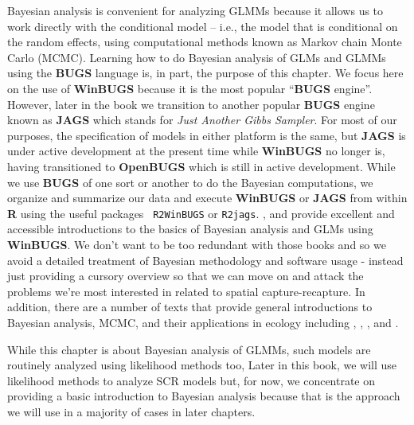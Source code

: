 Bayesian analysis is convenient for analyzing GLMMs because it allows
us to work directly with the conditional model -- i.e., the model that
is conditional on the random effects, using computational methods
known as Markov chain Monte Carlo (MCMC). Learning how to do Bayesian
analysis of GLMs and GLMMs using the {\bf BUGS} language is, in part, the purpose
of this chapter. We focus here on the use of {\bf WinBUGS} because it
is the most popular ``{\bf BUGS} engine''. However, later in the book
we transition to another popular {\bf BUGS} engine known as {\bf
  JAGS} \citep{plummer:2009} which stands for {\it Just Another Gibbs
  Sampler}. For most of our purposes, the specification of models in
either platform is the same, but {\bf JAGS} is under active
development at the present time while {\bf WinBUGS} no longer is,
having transitioned to 
{\bf OpenBUGS} \citep{lunn_etal:2009} which is still in active
development.  
 While we use {\bf BUGS} of one sort or another to do the Bayesian
computations, we organize and summarize our data and execute {\bf
  WinBUGS} or {\bf JAGS} from within {\bf R} using the useful packages \mbox{\tt
  R2WinBUGS} \citep{sturtz_etal:2005} or \mbox{\tt R2jags}.  \citet{kery:2010}, and
\citet{kery_schaub:2011} provide excellent and accessible introductions to the basics
of Bayesian analysis and GLMs using {\bf WinBUGS}.
We don't want to
be too redundant with those books and so we avoid a detailed
treatment of Bayesian methodology and software usage - instead just providing a cursory
overview so that we can move on and attack the problems we're most
interested in related to spatial capture-recapture.  In addition,
there are a number of texts that provide general introductions to
Bayesian analysis, MCMC, and their applications in ecology including
\citet{mccarthy:2007}, \citet{kery:2010}, \citet{link_barker:2010}, and
\citet{king_etal:2009}.


While this chapter is about Bayesian analysis of GLMMs, such models
are routinely analyzed using likelihood methods too, 
Later in
this book, we will use likelihood methods to analyze SCR models but,
for now, we concentrate on providing a basic introduction to Bayesian
analysis because that is the approach we will use in a majority of
cases in later chapters.


